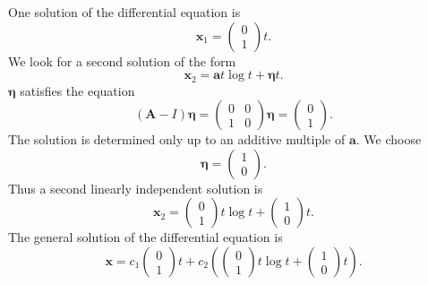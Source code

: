 {\begin{Solution}
\begin{enumerate}
\[    \]
    One solution of the differential equation is
    \[
    \mathbf{x}_1 = \begin{pmatrix} 0 \\ 1 \end{pmatrix} t.
    \]
    We look for a second solution of the form
    \[
    \mathbf{x}_2 = \mathbf{a} t \log t + \boldsymbol{\eta} t.
    \]
    $\boldsymbol{\eta}$ satisfies the equation
    \[
    (\mathbf{A} - I) \boldsymbol{\eta} = 
    \begin{pmatrix}
      0 & 0 \\
      1 & 0
    \end{pmatrix}
    \boldsymbol{\eta} = \begin{pmatrix} 0 \\ 1 \end{pmatrix}.
    \]
    The solution is determined only up to an additive multiple of $\mathbf{a}$.  
    We choose 
    \[
    \boldsymbol{\eta} = \begin{pmatrix} 1 \\ 0 \end{pmatrix}.
    \]
    Thus a second linearly independent solution is
    \[
    \mathbf{x}_2 = 
    \begin{pmatrix} 0 \\ 1 \end{pmatrix} t \log t + 
    \begin{pmatrix} 1 \\ 0 \end{pmatrix} t.
    \]
    The general solution of the differential equation is
    \[
    \boxed{
      \mathbf{x} = 
      c_1 \begin{pmatrix} 0 \\ 1 \end{pmatrix} t
      + c_2 \left( \begin{pmatrix} 0 \\ 1 \end{pmatrix} t \log t + 
        \begin{pmatrix} 1 \\ 0 \end{pmatrix} t \right).
      }
    \]


\end{enumerate}
\end{Solution}}

